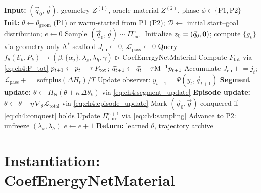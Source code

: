 \begin{algorithm}[t]
\caption{Material-Aware Continual Hamiltonian Learning}
\label{algo:ch4:material}
\begin{algorithmic}[1]
\State \textbf{Input:} $(\vec{q}_0,\vec{g})$, geometry $Z^{(1)}$,
       oracle material $Z^{(2)}$, phase $\phi\in\{\mathrm{P1},\mathrm{P2}\}$
\State \textbf{Init:} $\theta \leftarrow \theta_{\mathrm{geom}}$ (P1) or
       warm-started from P1 (P2); $\mathcal{D} \leftarrow$ initial
       start–goal distribution; $e \leftarrow 0$
  \State Sample $(\vec{q}_0,\vec{g}) \sim \Pi_{\mathrm{curr}}^e$
  \State Initialize $z_0 = (\vec{q}_0, \mathbf{0})$;
         compute $\{g_k\}$ via geometry-only A$^*$ scaffold
  \State $J_{\mathrm{ep}} \leftarrow 0$,\;
         $\mathcal{L}_{\mathrm{pass}} \leftarrow 0$
    \State Query $f_\theta(\mathcal{E}_k, P_k) \to
           (\beta,\{\alpha_j\},\lambda_s,\lambda_h,\gamma)$ \hfill
           $\triangleright$ CoefEnergyNetMaterial
      \State Compute $F_{\mathrm{tot}}$ via \eqref{eq:ch4:F_tot}
      \State $p_{t+1} \leftarrow p_t + \tau\,F_{\mathrm{tot}}$;\;
             $\vec{q}_{t+1} \leftarrow \vec{q}_t + \tau\mathrm{M}^{-1}p_{t+1}$
      \State Accumulate $J_{\mathrm{ep}} \mathrel{+}= j_t$;\;
             $\mathcal{L}_{\mathrm{pass}} \mathrel{+}= \mathrm{softplus}(\Delta H_t)/T$
      \State Update observer: $y_{t+1} = \Psi(y_t,\vec{q}_{t+1})$
    \EndFor
    \State \textbf{Segment update:} $\theta \leftarrow \Pi_\Theta(\theta
           + \kappa\,\Delta\theta_k)$ via \eqref{eq:ch4:segment_update}
  \EndFor
  \State \textbf{Episode update:}
         $\theta \leftarrow \theta - \eta\,\nabla_\theta\mathcal{L}_{\mathrm{total}}$
         via \eqref{eq:ch4:episode_update}
  \State Mark $(\vec{q}_0,\vec{g})$ conquered if \eqref{eq:ch4:conquest}
         holds
  \State Update $\Pi_{\mathrm{curr}}^{e+1}$ via \eqref{eq:ch4:sampling}
    \State Advance to P2: unfreeze $(\lambda_s,\lambda_h)$
  \EndIf
  \State $e \leftarrow e + 1$
\EndWhile
\State \textbf{Return:} learned $\theta$, trajectory archive
\end{algorithmic}
\end{algorithm}

\section{Instantiation: CoefEnergyNetMaterial}
\label{sec:ch4:implementation}

